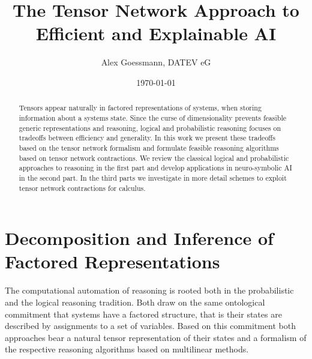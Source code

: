 \documentclass[aps,onecolumn,nofootinbib,pra]{article}
\begin{document}
\title{The Tensor Network Approach to Efficient and Explainable AI}
\author{Alex Goessmann, DATEV eG}

\maketitle
\date{\today}

\begin{abstract}
	Tensors appear naturally in factored representations of systems, when storing information about a systems state.
	Since the curse of dimensionality prevents feasible generic representations and reasoning, logical and probabilistic reasoning focuses on tradeoffs between efficiency and generality.
	In this work we present these tradeoffs based on the tensor network formalism and formulate feasible reasoning algorithms based on tensor network contractions.
	We review the classical logical and probabilistic approaches to reasoning in the first part and develop applications in neuro-symbolic AI in the second part.
	In the third parts we investigate in more detail schemes to exploit tensor network contractions for calculus.
\end{abstract}	

\tableofcontents




\part{Decomposition and Inference of Factored Representations}\label{par:one}

The computational automation of reasoning is rooted both in the probabilistic and the logical reasoning tradition.
Both draw on the same ontological commitment that systems have a factored structure, that is their states are described by assignments to a set of variables.
Based on this commitment both approaches bear a natural tensor representation of their states and a formalism of the respective reasoning algorithms based on multilinear methods.






\end{document}
